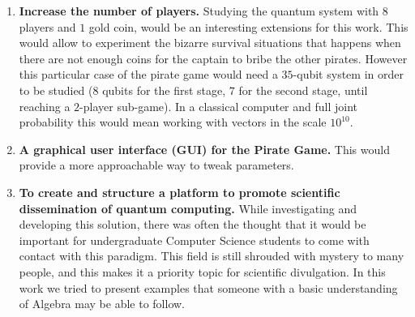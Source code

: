 \documentclass[10pt,twocolumn]{llncs}
\begin{document}
\begin{enumerate}
\item \textbf{Increase the number of players.} Studying the quantum system with $8$ players and $1$ gold coin, would be an interesting extensions for this work. This would allow to experiment the bizarre survival situations that happens when there are not enough coins for the captain to bribe the other pirates. However this particular case of the pirate game would need a $35$-qubit system in order to be studied ($8$ qubits for the first stage, $7$ for the second stage, until reaching a $2$-player sub-game). In a classical computer and full joint probability this would mean working with vectors in the scale $10^{10}$.

\item \textbf{A graphical user interface (GUI) for the Pirate Game.} This would provide a more approachable way to tweak parameters.

\item \textbf{To create and structure a platform to promote scientific dissemination of quantum computing.} While investigating and developing this solution, there was often the thought that it would be important for undergraduate Computer Science students to come with contact with this paradigm. This field is still shrouded with mystery to many people, and this makes it a priority topic for scientific divulgation. In this work we tried to present examples that someone with a basic understanding of Algebra may be able to follow.
\end{enumerate}

 
 






%
%
%
%



\end{document}

